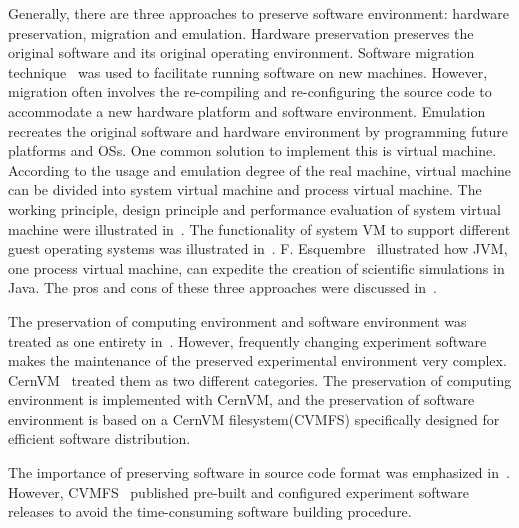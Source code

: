 \documentclass[procedia]{easychair}
\begin{document}
Generally, there are three approaches to preserve software environment:
hardware preservation, migration and emulation.  Hardware
preservation preserves the original software and its original operating
environment. 
Software migration technique~\cite{cifuentes1996binary,mancl2001refactoring} was used to facilitate running software on new machines.
However, migration often involves the re-compiling and re-configuring
the source code to accommodate a new hardware platform and software environment.
Emulation recreates the original software and hardware environment by
programming future platforms and OSs. One common solution to implement this is
virtual machine. According to the usage and emulation degree of the real
machine, virtual machine can be divided into system virtual machine and process
virtual machine. 
The working principle, design principle and
performance evaluation of system virtual machine were illustrated in~\cite{goldberg1974survey, smith2005architecture}. 
The
functionality of system VM to support different guest operating systems was illustrated in~\cite{barham2003xen,kivity2007kvm,rosenblum1999vmware}.
F. Esquembre~\cite{esquembre2004easy} illustrated how JVM, one process virtual machine, can expedite the creation of
scientific simulations in Java. 
The pros and cons of these three approaches were discussed in~\cite{matthews2009towards,phelps2005no,hong2010software}.

The preservation of computing environment and software environment was treated as one entirety in~\cite{matthews2009towards,phelps2005no,hong2010software}. However, frequently changing experiment software makes the maintenance of the preserved experimental environment very complex. 
CernVM~\cite{buncic2010cernvm} treated them as two different categories. The preservation of computing environment is implemented with CernVM, and the preservation of software environment is based on a CernVM filesystem(CVMFS) specifically designed for efficient software distribution.

The importance of preserving software in source code format was emphasized in~\cite{zabolitzky2002preserving,castagne2013consider}. 
However, CVMFS~\cite{buncic2010cernvm} published pre-built and configured experiment software releases to avoid the time-consuming software building procedure. 
\end{document}
